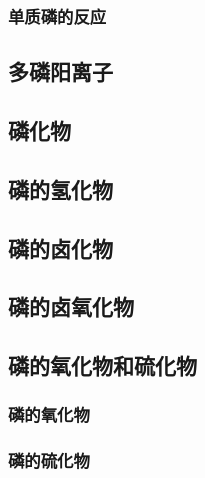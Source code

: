 \documentclass{ctexart}
\begin{document}
\subsubsection{单质磷的反应}
\subsection{多磷阳离子}
\subsection{磷化物}
\subsection{磷的氢化物}
\subsubsection{}
\subsubsection{}
\subsection{磷的卤化物}
\subsubsection{}
\subsubsection{}
\subsubsection{}
\subsection{磷的卤氧化物}
\subsection{磷的氧化物和硫化物}
\subsubsection{磷的氧化物}
\subsubsection{磷的硫化物}
\end{document}
